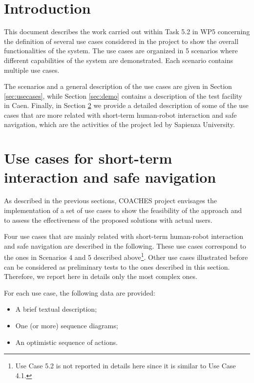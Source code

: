 \section{Introduction}

This document describes the work carried out within Task 5.2 in WP5 concerning the definition of several use cases considered in the project to show the overall functionalities of the system.
The use cases are organized in 5 scenarios where different capabilities of the system are demonstrated. Each scenario contains multiple use cases.

The scenarios and a general description of the use cases are given in Section \ref{sec:usecases}, while Section \ref{sec:demo} contains a description of the test facility in Caen.
Finally, in Section \ref{sec:usecase_sapienza} we provide a detailed description of some of the use cases that are more related with short-term human-robot interaction and safe navigation, which are the activities of the project led by Sapienza University.









\section{Use cases for short-term interaction and safe navigation}
\label{sec:usecase_sapienza}

As described in the previous sections,
COACHES project envisages the implementation of a set of use cases
to show the feasibility of the approach and to assess the effectiveness
of the proposed solutions with actual users.

Four use cases that are mainly related with short-term human-robot interaction and safe navigation are described in the following. These use cases correspond to the ones in Scenarios 4 and 5 described above\footnote{Use Case 5.2 is not reported in details here since it is similar to Use Case 4.1.}.
Other use cases illustrated before can be considered as preliminary tests to the ones described in this section. Therefore, we report here in details only the most complex ones.

For each use case, the following data are provided:
\begin{itemize}
\item A brief textual description;
\item One (or more) sequence diagrams;
\item An optimistic sequence of actions.
\end{itemize}

